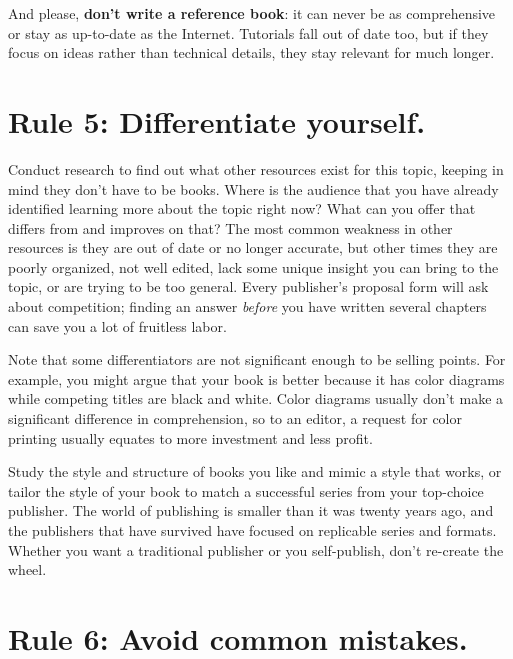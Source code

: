 \documentclass[10pt,letterpaper]{article}
\begin{document}
And please, \textbf{don't write a reference book}: it can never be as
comprehensive or stay as up-to-date as the Internet. Tutorials fall out
of date too, but if they focus on ideas rather than technical details,
they stay relevant for much longer.

\section*{Rule 5: Differentiate yourself.}

Conduct research to find out what other resources exist for this topic,
keeping in mind they don't have to be books. Where is the audience that
you have already identified learning more about the topic right now?
What can you offer that differs from and improves on that? The most
common weakness in other resources is they are out of date or no longer
accurate, but other times they are poorly organized, not well edited,
lack some unique insight you can bring to the topic, or are trying to be
too general. Every publisher's proposal form will ask about competition;
finding an answer \emph{before} you have written several chapters can
save you a lot of fruitless labor.

Note that some differentiators are not significant enough to be selling
points. For example, you might argue that your book is better because it
has color diagrams while competing titles are black and white. Color
diagrams usually don't make a significant difference in comprehension,
so to an editor, a request for color printing usually equates to more
investment and less profit.

Study the style and structure of books you like and mimic a style that
works, or tailor the style of your book to match a successful series
from your top-choice publisher.  The world of publishing is smaller
than it was twenty years ago, and the publishers that have survived
have focused on replicable series and formats.  Whether you want a
traditional publisher or you self-publish, don't re-create the wheel.

\section*{Rule 6: Avoid common mistakes.}
\end{document}
